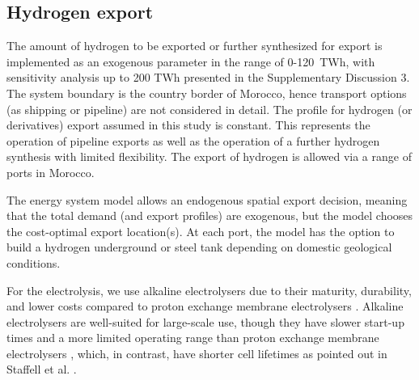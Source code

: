 \subsection*{Hydrogen export}
\label{subsec:hydrogen_export}
The amount of hydrogen to be exported or further synthesized for export is  implemented as an exogenous parameter in the range of 0-120~TWh, with sensitivity analysis up to 200 TWh presented in the Supplementary Discussion 3.
The system boundary is the country border of Morocco, hence transport options (as shipping or pipeline) are not considered in detail. The profile for hydrogen (or derivatives) export assumed in this study is constant. This represents the operation of pipeline exports as well as the operation of a further hydrogen synthesis with limited flexibility. The export of hydrogen is allowed via a range of ports in Morocco.


The energy system model allows an endogenous spatial export decision, meaning that the total demand (and export profiles) are exogenous, but the model chooses the  cost-optimal export location(s). At each port, the model has the option to build a hydrogen underground or steel tank depending on domestic geological conditions.

For the electrolysis, we use alkaline electrolysers due to their maturity, durability, and lower costs compared to proton exchange membrane electrolysers \cite{Staffell2019,DEA2019TechnologyData}.
Alkaline electrolysers are well-suited for large-scale use, though they have slower start-up times and a more limited operating range   
than proton exchange membrane electrolysers \cite{Staffell2019, Gotz2016}, which, in contrast, have  shorter cell lifetimes as pointed out in Staffell et al. \cite{Staffell2019}.